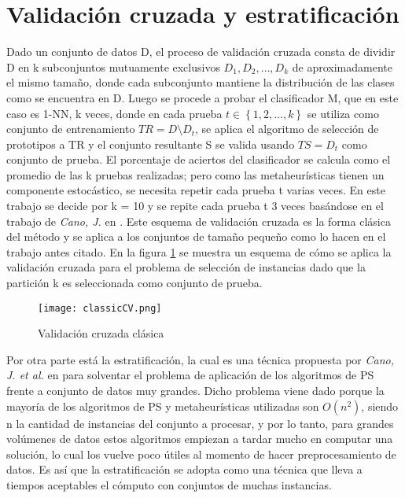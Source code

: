 \section{Validación cruzada y estratificación}

Dado un conjunto de datos D, el proceso de validación cruzada \cite{kohavi1995study} consta de dividir D en k subconjuntos mutuamente exclusivos $D_1,D_2,\dots,D_k$ de aproximadamente el mismo tamaño, donde cada subconjunto mantiene la distribución de las clases como se encuentra en D. Luego se procede a probar el clasificador M, que en este caso es 1-NN, k veces, donde en cada prueba $t \in \left\{1,2,\dots,k\right\}$ se utiliza como conjunto de entrenamiento $TR=D \setminus D_t$, se aplica el algoritmo de selección de prototipos a TR y el conjunto resultante S se valida usando $TS=D_t$ como conjunto de prueba. El porcentaje de aciertos del clasificador se calcula como el promedio de las k pruebas realizadas; pero como las metaheurísticas tienen un componente estocástico, se necesita repetir cada prueba t varias veces. En este trabajo se decide por k = 10 y se repite cada prueba t 3 veces basándose en el trabajo de \emph{Cano, J.} en \cite{de2004reduccion}. Este esquema de validación cruzada es la forma clásica del método y se aplica a los conjuntos de tamaño pequeño como lo hacen en el trabajo antes citado. En la figura \ref{crossval} se muestra un esquema de cómo se aplica la validación cruzada para el problema de selección de instancias dado que la partición k es seleccionada como conjunto de prueba.

\begin{figure}[]
\centering
\texttt{[image: classicCV.png]}
\caption[Validación cruzada clásica]{Validación cruzada clásica}
\label{crossval}
\end{figure}

Por otra parte está la estratificación, la cual es una técnica propuesta por \emph{Cano, J. et al.} en \cite{cano2005stratification} para solventar el problema de aplicación de los algoritmos de PS frente a conjunto de datos muy grandes. Dicho problema viene dado porque la mayoría de los algoritmos de PS y metaheurísticas utilizadas son $O(n^2)$, siendo n la cantidad de instancias del conjunto a procesar, y por lo tanto, para grandes volúmenes de datos estos algoritmos empiezan a tardar mucho en computar una solución, lo cual los vuelve poco útiles al momento de hacer preprocesamiento de datos. Es así que la estratificación se adopta como una técnica que lleva a tiempos aceptables el cómputo con conjuntos de muchas instancias. 

